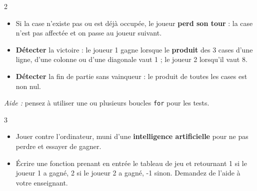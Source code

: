 \begin{UPSTICahierDesCharges}{2}
\begin{itemize}
  \item Si la case n'existe pas ou est déjà occupée, le joueur \textbf{perd son tour} : la case n'est pas affectée et on passe au joueur suivant.
  \item \textbf{Détecter} la victoire : le joueur 1 gagne lorsque le \textbf{produit} des 3 cases d'une ligne, d'une colonne ou d'une diagonale vaut 1 ; le joueur 2 lorsqu'il vaut 8.
  \item \textbf{Détecter} la fin de partie sans vainqueur : le produit de toutes les cases est non nul.
\end{itemize}
\textit{Aide :} pensez à utiliser une ou plusieurs boucles \texttt{for} pour les tests.
\end{UPSTICahierDesCharges}

\begin{UPSTICahierDesCharges}{3}
\begin{itemize}
  \item Jouer contre l'ordinateur, muni d'une \textbf{intelligence artificielle} pour ne pas perdre et essayer de gagner.
  \item Écrire une fonction prenant en entrée le tableau de jeu et retournant 1 si le joueur 1 a gagné, 2 si le joueur 2 a gagné, -1 sinon. Demandez de l'aide à votre enseignant.
\end{itemize}
\end{UPSTICahierDesCharges}

